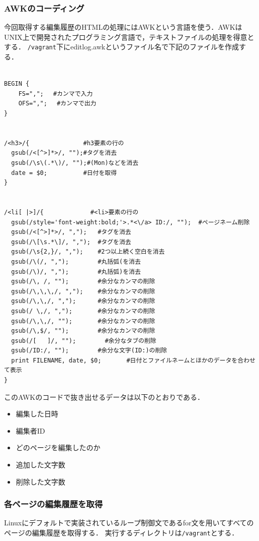 \subsubsection{AWKのコーディング}

今回取得する編集履歴のHTMLの処理にはAWKという言語を使う．AWKはUNIX上で開発されたプログラミング言語で，テキストファイルの処理を得意とする．
\texttt{/vagrant}下にeditlog.awkというファイル名で下記のファイルを作成する．

\begin{verbatim}

BEGIN {
    FS=",";　 #カンマで入力
    OFS=",";　 #カンマで出力
}


/<h3>/{               #h3要素の行の
  gsub(/<[^>]*>/, "");#タグを消去
  gsub(/\s\(.*\)/, "");#(Mon)などを消去
  date = $0;          #日付を取得
}


/<li[ |>]/{             #<li>要素の行の
  gsub(/style='font-weight:bold;'>.*<\/a> ID:/, "");  #ページネーム削除
  gsub(/<[^>]*>/, ",");   #タグを消去
  gsub(/\[\s.*\]/, ",");  #タグを消去
  gsub(/\s{2,}/, ",");    #2つ以上続く空白を消去
  gsub(/\(/, ",");        #丸括弧(を消去
  gsub(/\)/, ",");        #丸括弧)を消去
  gsub(/\, /, "");        #余分なカンマの削除
  gsub(/\,\,\,/, ",");    #余分なカンマの削除
  gsub(/\,\,/, ",");      #余分なカンマの削除
  gsub(/ \,/, ",");       #余分なカンマの削除
  gsub(/\,\,/, "");       #余分なカンマの削除
  gsub(/\,$/, "");        #余分なカンマの削除
  gsub(/[	]/, "");        #余分なタブの削除
  gsub(/ID:/, "");        #余分な文字(ID:)の削除
  print FILENAME, date, $0;       #日付とファイルネームとほかのデータを合わせて表示
}

\end{verbatim}

このAWKのコードで抜き出せるデータは以下のとおりである．

\begin{itemize}
\item 編集した日時
\item 編集者ID
\item どのページを編集したのか
\item 追加した文字数
\item 削除した文字数
\end{itemize}


\subsubsection{各ページの編集履歴を取得}

Linuxにデフォルトで実装されているループ制御文であるfor文を用いてすべてのページの編集履歴を取得する．
実行するディレクトリは\texttt{/vagrant}とする．

